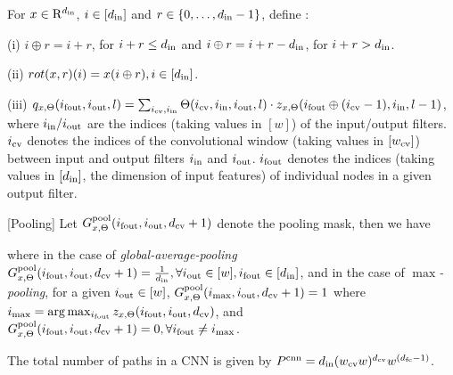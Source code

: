 \begin{definition}
For $x\in\mathrm{R}^{d_{\text{in}}}$, $i\in[d_{\text{in}}]$ and $r\in\{0,\ldots,d_{\text{in}}-1\}$, define :

(i) $i\oplus r = i+r$, for $i+r \leq d_{\text{in}}$ and $i\oplus r =i+r-d_{\text{in}}$, for $i+r>d_{\text{in}}$.

(ii) $rot(x,r)(i)=x(i\oplus r), i\in[d_{\text{in}}]$.

(iii) $q_{x,\Theta}(i_{\text{fout}},i_{\text{out}},l)=\sum_{i_{\text{cv}},i_{\text{in}}}\Theta(i_{\text{cv}},i_{\text{in}},i_{\text{out}},l)\cdot z_{x,\Theta}(i_{\text{fout}}\oplus (i_{\text{cv}}-1),i_{\text{in}},l-1)$, where $i_{\text{in}}/i_{\text{out}}$ are the indices (taking values in $[w]$) of the input/output filters. $i_{\text{cv}}$ denotes the indices of the convolutional window (taking values in $[w_{\text{cv}}]$) between input and output filters $i_{\text{in}}$ and $i_{\text{out}}$. $i_{\text{fout}}$ denotes the indices (taking values in $[d_{\text{in}}]$, the dimension of input features) of individual nodes in a given output filter.
\end{definition}
\begin{definition}\label{def:pooling}[Pooling]
Let $G^{\text{pool}}_{x,\Theta}(i_{\text{fout}},i_{\text{out}},d_{\text{cv}}+1)$ denote the pooling mask, then we have
\centerline{}
where in the case of \emph{global-average-pooling} $G^{\text{pool}}_{x,\Theta}(i_{\text{fout}},i_{\text{out}},d_{\text{cv}}+1)=\frac{1}{d_{\text{in}}},\forall i_{\text{out}}\in[w], i_{\text{fout}}\in[d_{\text{in}}]$, and in the case of \emph{$\max$-pooling},  
for a given $i_{\text{out}}\in[w]$, $G^{\text{pool}}_{x,\Theta}(i_{\max},i_{\text{out}},d_{\text{cv}}+1)=1$ where $i_{\max}=\arg\max_{i_{\text{fout}}}z_{x,\Theta}(i_{\text{fout}},i_{\text{out}},d_{\text{cv}})$, and $G^{\text{pool}}_{x,\Theta}(i_{\text{fout}},i_{\text{out}},d_{\text{cv}}+1)=0,\forall i_{\text{fout}}\neq i_{\max}$.
\end{definition}

\begin{proposition}
The total number of paths in a CNN is given by  $P^{\text{cnn}}=d_{\text{in}}(w_{\text{cv}} w)^{d_{\text{cv}}}w^{(d_{\text{fc}}-1)}$.
\end{proposition}


